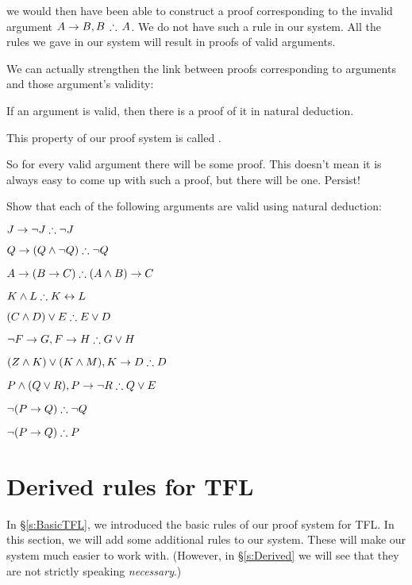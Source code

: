 	we would then have been able to construct a proof corresponding to the invalid argument $A\eif B, B\,\therefore\, A$.
We do not have such a rule in our system. All the rules we gave in our system will result in proofs of valid arguments.


We can actually strengthen the link between proofs corresponding to arguments and those argument's validity:
\begin{highlighted}
If an argument is valid, then there is a proof of it in natural deduction.
\end{highlighted}
This property of our proof system is called .

So for every valid argument there will be some proof. This doesn't mean it is always easy to come up with such a proof, but there will be one. Persist!






\begin{practiceproblems}

\problempart
\label{pr.solvedTFLproofs}
Show that each of the following arguments are valid using natural deduction:
\begin{earg}
\item $J\eif\enot J \therefore \enot J$
\item $Q\eif(Q\eand\enot Q) \therefore \enot Q$
\item $A\eif (B\eif C) \therefore (A\eand B)\eif C$
\item $K\eand L \therefore K\eiff L$
\item $(C\eand D)\eor E \therefore E\eor D$
\item $\enot F\eif G, F\eif H \therefore G\eor H$
\item $(Z\eand K) \eor (K\eand M), K \eif D \therefore D$
\item $P \eand (Q\eor R), P\eif \enot R \therefore Q\eor E$
\item $\enot (P \eif Q) \therefore \enot Q$
\item $\enot (P \eif Q) \therefore P$
\end{earg}



\end{practiceproblems}



\chapter{Derived rules for TFL}\label{s:Further}
In \S\ref{s:BasicTFL}, we introduced the basic rules of our proof system for TFL. In this section, we will add some additional rules to our system. These will make our system much easier to work with. (However, in \S\ref{s:Derived} we will see that they are not strictly speaking \emph{necessary}.)

